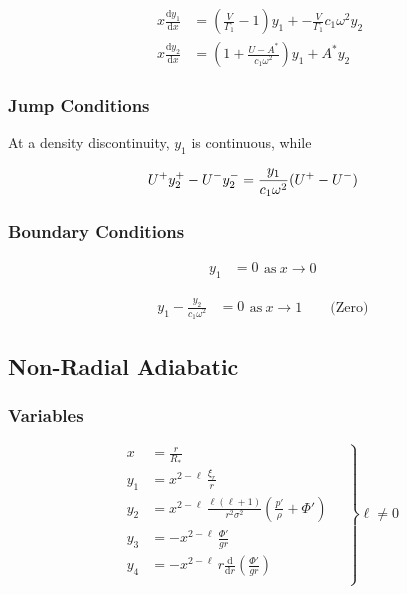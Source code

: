 \documentclass[fleqn]{article}
\newcommand{\diff}{\ensuremath{\mathrm{d}}}
\newcommand{\Vg}{\ensuremath{\frac{V}{\Gamma_{1}}}}
\newcommand{\As}{\ensuremath{A^{\ast}}}
\newcommand{\Rstar}{\ensuremath{R_{\ast}}}
\begin{document}
\begin{align*}
x \frac{\diff y_{1}}{\diff x} &=
\left(\Vg - 1 \right) y_{1} +
- \Vg c_{1} \omega^{2} y_{2} \\
x \frac{\diff y_{2}}{\diff x} &=
\left(1 + \frac{U - \As}{c_{1} \omega^{2}} \right) y_{1} +
\As y_{2}
\end{align*}

\subsubsection*{Jump Conditions}

At a density discontinuity, $y_{1}$ is continuous, while

\begin{align*}
U^{\rm +} y_{2}^{+} - U^{-} y_{2}^{-} &= \frac{y_{1}}{c_{1}\omega^{2}} (U^{+} - U^{-})
\end{align*}

\subsubsection*{Boundary Conditions}

\begin{equation*}
\begin{aligned}
y_{1} &= 0
\end{aligned}
\text{as}\ x \rightarrow 0
\end{equation*}

\begin{equation*}
\begin{aligned}
y_{1} - \frac{y_{2}}{c_{1} \omega^{2}} &= 0
\end{aligned}
\text{as}\ x \rightarrow 1 \qquad \text{(Zero)}
\end{equation*}


\newpage

\subsection*{Non-Radial Adiabatic}

\subsubsection*{Variables}

\begin{equation*}
\left.
\begin{aligned}
x     &= \frac{r}{\Rstar} \\
y_{1} &= x^{2-\ell}\, \frac{\xi_{r}}{r} \\
y_{2} &= x^{2-\ell}\, \frac{\ell(\ell+1)}{r^{2} \sigma^{2}} \left( \frac{p'}{\rho} + \Phi' \right) \\
y_{3} &= - x^{2-\ell}\, \frac{\Phi'}{gr} \\
y_{4} &= - x^{2-\ell}\, r \frac{\diff}{\diff r} \left( \frac{\Phi'}{g r} \right) \\
\end{aligned}
\quad \right\} \ell \neq 0
\end{equation*}
\end{document}
